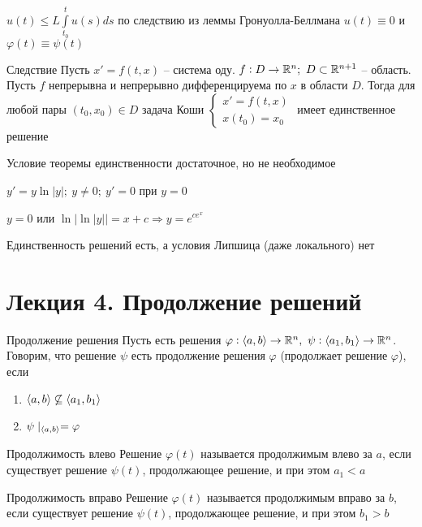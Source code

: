 \documentclass[12pt]{article}
\begin{document}
$u(t) \leq L\int\limits_{t_0}^t u(s) ds$ по следствию из леммы Гронуолла-Беллмана $u(t) \equiv 0$ и $\varphi(t) \equiv \psi(t)$

\begin{theo}{Следствие}
    Пусть $x' = f(t, x)$ -- система оду. $f : D \to \mathbb R^n;\ D \subset \mathbb R^{n + 1}$ -- область. Пусть $f$ непрерывна и непрерывно дифференцируема по $x$ в области $D$. Тогда для любой пары $(t_0, x_0) \in D$ задача Коши $\begin{cases}
        x' = f(t, x) \\
        x(t_0) = x_0
    \end{cases}$ имеет единственное решение
\end{theo}

\begin{Remark}{}
    Условие теоремы единственности достаточное, но не необходимое 

    $y' = y\ln|y|;\ y \neq 0;\ y' = 0$ при $y = 0$

    $y = 0$ или $\ln|\ln|y|| = x + c \Rightarrow y = e^{ce^x}$

    Единственность решений есть, а условия Липшица (даже локального) нет
\end{Remark}

\newpage 

\section{Лекция 4. Продолжение решений}

\begin{defin}{Продолжение решения}
    Пусть есть решения $\varphi : \langle a, b \rangle \to \mathbb R^n,\ \psi : \langle a_1, b_1 \rangle \to \mathbb R^n$. Говорим, что решение $\psi$ есть продолжение решения $\varphi$ (продолжает решение $\varphi$), если 

    \begin{enumerate}
        \item $\langle a, b \rangle \not\subseteq \langle a_1, b_1 \rangle$
        \item $\psi\mid_{\langle a, b \rangle} = \varphi$
    \end{enumerate}
\end{defin}

\begin{defin}{Продолжимость влево}
    Решение $\varphi(t)$ называется продолжимым влево за $a$, если существует решение $\psi(t)$, продолжающее решение, и при этом $a_1 < a$
\end{defin}

\begin{defin}{Продолжимость вправо}
    Решение $\varphi(t)$ называется продолжимым вправо за $b$, если существует решение $\psi(t)$, продолжающее решение, и при этом $b_1 > b$
\end{defin}
\end{document}
